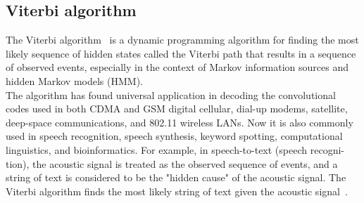 \subsection{Viterbi algorithm} \label{subsec:viterbi}
The Viterbi algorithm~\cite{viterbi} is a dynamic programming algorithm for finding the most likely sequence of hidden states called
the Viterbi path that results in a sequence of observed events, especially in the context of Markov information
sources and hidden Markov models (HMM).\\
The algorithm has found universal application in decoding the convolutional codes used in both CDMA and GSM digital cellular,
dial-up modems, satellite, deep-space communications, and 802.11 wireless LANs.
Now it is also commonly used in speech recognition, speech synthesis, keyword spotting, computational linguistics, and bioinformatics.
For example, in speech-to-text (speech recogni- tion), the acoustic signal is treated as the observed sequence of events, and a string of text is considered
to be the "hidden cause" of the acoustic signal.
The Viterbi algorithm finds the most likely string of text given the acoustic signal~\cite{DBLP:journals/corr/abs-cs-0504020}. \\

